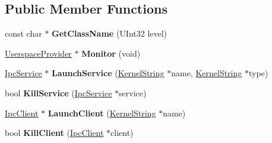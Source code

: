 \subsection*{Public Member Functions}
\begin{DoxyCompactItemize}
\item 
\mbox{\label{class_i_p_c___service_1_1_actual_userspace_provider_ae0869d9c5fee31f786c69d239f9e212f}} 
const char $\ast$ {\bfseries Get\+Class\+Name} (U\+Int32 level)
\item 
\mbox{\label{class_i_p_c___service_1_1_actual_userspace_provider_a5d89b927ecd4dedd01d02028588bc5cf}} 
\hyperlink{class_i_p_c___service_1_1_userspace_provider}{Userspace\+Provider} $\ast$ {\bfseries Monitor} (void)
\item 
\mbox{\label{class_i_p_c___service_1_1_actual_userspace_provider_ab41ede0b661c580bec3a653a404e9010}} 
\hyperlink{class_ipc_service}{Ipc\+Service} $\ast$ {\bfseries Launch\+Service} (\hyperlink{class_kernel_string}{Kernel\+String} $\ast$name, \hyperlink{class_kernel_string}{Kernel\+String} $\ast$type)
\item 
\mbox{\label{class_i_p_c___service_1_1_actual_userspace_provider_a2a171142311c637e61e3b7615039f70f}} 
bool {\bfseries Kill\+Service} (\hyperlink{class_ipc_service}{Ipc\+Service} $\ast$service)
\item 
\mbox{\label{class_i_p_c___service_1_1_actual_userspace_provider_afcaa9880e30eda7b488e9225603da096}} 
\hyperlink{class_ipc_client}{Ipc\+Client} $\ast$ {\bfseries Launch\+Client} (\hyperlink{class_kernel_string}{Kernel\+String} $\ast$name)
\item 
\mbox{\label{class_i_p_c___service_1_1_actual_userspace_provider_a7ce03fcf818273560973087cfa541909}} 
bool {\bfseries Kill\+Client} (\hyperlink{class_ipc_client}{Ipc\+Client} $\ast$client)
\end{DoxyCompactItemize}
